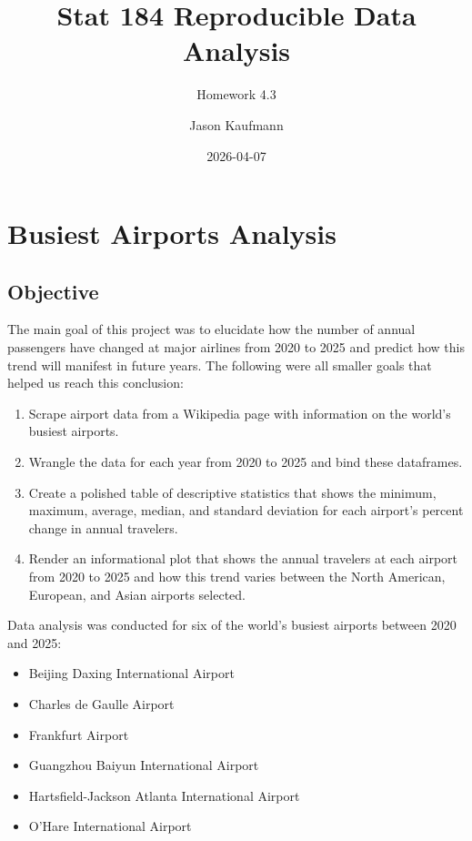 \documentclass[
  letterpaper,
  DIV=11,
  numbers=noendperiod]{scrartcl}
\title{Stat 184 Reproducible Data Analysis}
\subtitle{Homework 4.3}
\author{Jason Kaufmann}
\date{2026-04-07}
\providecommand{\tightlist}{%
  \setlength{\itemsep}{0pt}\setlength{\parskip}{0pt}}
\renewcommand*\contentsname{Table of contents}
\newcommand\contentsname{Table of contents}
\begin{document}
\maketitle

\renewcommand*\contentsname{Table of contents}
{
\hypersetup{linkcolor=}
\setcounter{tocdepth}{4}
\tableofcontents
}

\section{Busiest Airports Analysis}\label{busiest-airports-analysis}

\subsection{Objective}\label{objective}

The main goal of this project was to elucidate how the number of annual
passengers have changed at major airlines from 2020 to 2025 and predict
how this trend will manifest in future years. The following were all
smaller goals that helped us reach this conclusion:

\begin{enumerate}
\def\labelenumi{\arabic{enumi}.}
\tightlist
\item
  Scrape airport data from a Wikipedia page with information on the
  world's busiest airports.
\item
  Wrangle the data for each year from 2020 to 2025 and bind these
  dataframes.
\item
  Create a polished table of descriptive statistics that shows the
  minimum, maximum, average, median, and standard deviation for each
  airport's percent change in annual travelers.
\item
  Render an informational plot that shows the annual travelers at each
  airport from 2020 to 2025 and how this trend varies between the North
  American, European, and Asian airports selected.
\end{enumerate}

Data analysis was conducted for six of the world's busiest airports
between 2020 and 2025:

\begin{itemize}
\item
  Beijing Daxing International Airport
\item
  Charles de Gaulle Airport
\item
  Frankfurt Airport
\item
  Guangzhou Baiyun International Airport
\item
  Hartsfield-Jackson Atlanta International Airport
\item
  O'Hare International Airport
\end{itemize}
\end{document}
